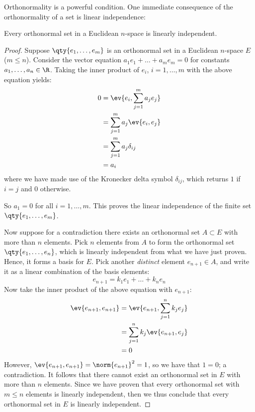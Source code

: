 Orthonormality is a powerful condition. One immediate consequence of the orthonormality of a set is linear independence:
\begin{proposition}
  Every orthonormal set in a Euclidean \( n \)-space is linearly independent.
\end{proposition}
\begin{proof}
  Suppose \( \qty{e_1,\dots,e_m} \) is an orthonormal set in a Euclidean \( n \)-space \( E \) (\( m\leq n \)). Consider the vector equation \( a_1e_1+\dots+a_me_m=0 \) for constants \( a_1,\dots,a_n\in\R \). Taking the inner product of \( e_i \), \( i=1,\dots,m \) with the above equation yields:
  \begin{align*}
    0&= \ev{e_i,\sum_{j=1}^ma_je_j}\\
    &=\sum_{j=1}^ma_j\ev{e_i,e_j}\\
    &= \sum_{j=1}^ma_j\delta_{ij}\\
    &= a_i
  \end{align*}
  where we have made use of the Kronecker delta symbol \( \delta_{ij} \), which returns \( 1 \) if \( i=j \) and 0 otherwise.

  \vspace{3mm}

  
  So \( a_1=0 \) for all \( i=1,\dots, m \). This proves the linear independence of the finite set \( \qty{e_1,\dots,e_m} \).

  \vspace{3mm}

  Now suppose for a contradiction there exists an orthonormal set \( A\subset E \) with more than \( n \) elements. Pick \( n \) elements from \( A \) to form the orthonormal set \( \qty{e_1,\dots,e_n} \), which is linearly independent from what we have just proven. Hence, it forms a basis for \( E \). Pick another \emph{distinct} element \( e_{n+1}\in A \), and write it as a linear combination of the basis elements:
  \[ e_{n+1}=k_1e_1+\dots+k_ne_n \]
  Now take the inner product of the above equation with \( e_{n+1} \):
  \begin{align*}
    \ev{e_{n+1},e_{n+1}}&= \ev{e_{n+1},\sum_{j=1}^nk_je_j}\\
    &= \sum_{j=1}^nk_j\ev{e_{n+1},e_j}\\
    &= 0
  \end{align*}
  However, \( \ev{e_{n+1},e_{n+1}}=\norm{e_{n+1}}^2=1 \), so we have that \( 1=0 \); a contradiction. It follows that there cannot exist an orthonormal set in \( E \) with more than \( n \) elements. Since we have proven that every orthonormal set with \( m\leq n \) elements is linearly independent, then we thus conclude that every orthonormal set in \( E \) is linearly independent.
\end{proof}

